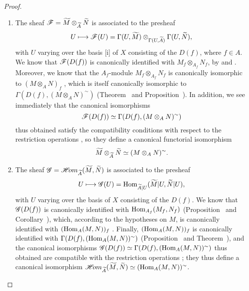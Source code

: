 \begin{proof}
\label{proof-1.1.3.12}
\medskip\noindent
\begin{enumerate}[label=(\roman*)]
  \item The sheaf $\mathscr{F}={\widetilde{M}}\otimes_{\widetilde{A}}{\widetilde{N}}$ is associated to the presheaf
    \[
      U\mapsto\sh{F}(U)=\Gamma(U,\wt{M})\otimes_{\Gamma(U,\wt{A})}\Gamma(U,\wt{N}),
    \]
    with $U$ varying over the basis [i] of $X$ consisting of the $D(f)$, where $f\in A$.
    We know that $\mathscr{F}(D(f))$ is canonically identified with $M_f\otimes_{A_f}N_f$, by  and .
    Moreover, we know that the $A_f$-module $M_f\otimes_{A_f}N_f$ is canonically
    isomorphic to $(M\otimes_A N)_f$ , which is itself canonically isomorphic to $\Gamma(D(f),(M\otimes_A N)^\sim)$ (Theorem~ and Proposition~).
    In addition, we see immediately that the canonical isomorphisms
    \[
      \mathscr{F}(D(f))\simeq\Gamma(D(f),(M\otimes_A N)^\sim)
    \]
    thus obtained satisfy the compatibility conditions with respect to the restriction operations , so they define a canonical functorial isomorphism
    \[
      {\widetilde{M}}\otimes_{\widetilde{A}}{\widetilde{N}}\simeq(M\otimes_A N)^\sim.
    \]
  \item The sheaf $\mathscr{G}=\mathscr{H}\!{om}_{\widetilde{A}}({\widetilde{M}},{\widetilde{N}})$ is associated to the presheaf
    \[
      U\mapsto\sh{G}(U)=\Hom_{\wt{A}|U}(\wt{M}|U,\wt{N}|U),
    \]
    with $U$ varying over the basis of $X$ consisting of the $D(f)$.
    We know that $\mathscr{G}(D(f))$ is canonically identified with ${\mathop{\mathrm{Hom}}\nolimits}_{A_f}(M_f,N_f)$ (Proposition~ and
    Corollary~), which, according to the hypotheses on $M$, is canonically identified with $({\mathop{\mathrm{Hom}}\nolimits}_A(M,N))_f$ .
    Finally, $({\mathop{\mathrm{Hom}}\nolimits}_A(M,N))_f$ is canonically identified with $\Gamma(D(f),({\mathop{\mathrm{Hom}}\nolimits}_A(M,N))^\sim)$ (Proposition~ and Theorem~), and the canonical isomorphisms $\mathscr{G}(D(f))\simeq\Gamma(D(f),({\mathop{\mathrm{Hom}}\nolimits}_A(M,N))^\sim)$ thus obtained are compatible with the restriction operations ;
    they thus define a canonical isomorphism $\mathscr{H}\!{om}_{\widetilde{A}}({\widetilde{M}},{\widetilde{N}})\simeq({\mathop{\mathrm{Hom}}\nolimits}_A(M,N))^\sim$.
\end{enumerate}
\end{proof}

